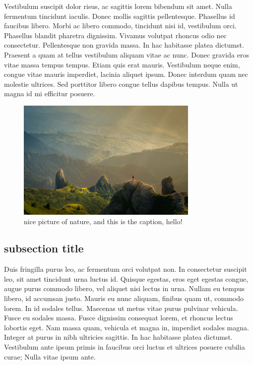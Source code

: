 \begin{refsection}
Vestibulum suscipit dolor risus, ac sagittis lorem bibendum sit amet. Nulla fermentum tincidunt iaculis. Donec mollis sagittis pellentesque. Phasellus id faucibus libero. Morbi ac libero commodo, tincidunt nisi id, vestibulum orci. Phasellus blandit pharetra dignissim. Vivamus volutpat rhoncus odio nec consectetur. Pellentesque non gravida massa. In hac habitasse platea dictumst. Praesent a quam at tellus vestibulum aliquam vitae ac nunc. Donec gravida eros vitae massa tempus tempus. Etiam quis erat mauris. Vestibulum neque enim, congue vitae mauris imperdiet, lacinia aliquet ipsum. Donec interdum quam nec molestie ultrices. Sed porttitor libero congue tellus dapibus tempus. Nulla ut magna id mi efficitur posuere.



\FloatBarrier
\begin{figure}[!ht]
\centering
\includegraphics[width=0.78\textwidth]{../General_Disc/Images/nature_image.jpg}
\caption{nice picture of nature, and this is the caption, hello!}
\label{fig:Disc_Fig_1}
\end{figure}
\FloatBarrier

\newpage
\subsection{subsection title}

Duis fringilla purus leo, ac fermentum orci volutpat non. In consectetur suscipit leo, sit amet tincidunt urna luctus id. Quisque egestas, eros eget egestas congue, augue purus commodo libero, vel aliquet nisi lectus in urna. Nullam eu tempus libero, id accumsan justo. Mauris eu nunc aliquam, finibus quam ut, commodo lorem. In id sodales tellus. Maecenas ut metus vitae purus pulvinar vehicula. Fusce eu sodales massa. Fusce dignissim consequat lorem, et rhoncus lectus lobortis eget. Nam massa quam, vehicula et magna in, imperdiet sodales magna. Integer at purus in nibh ultricies sagittis. In hac habitasse platea dictumst. Vestibulum ante ipsum primis in faucibus orci luctus et ultrices posuere cubilia curae; Nulla vitae ipsum ante.


\end{refsection}
